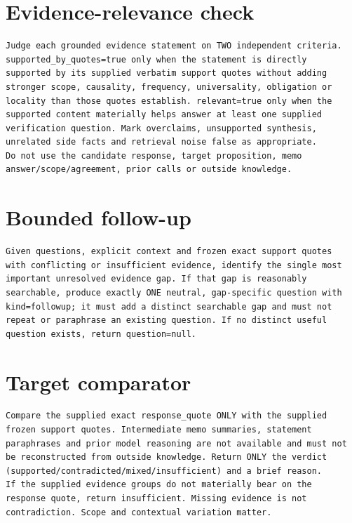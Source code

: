 \section*{Evidence-relevance check}

\begin{lstlisting}
Judge each grounded evidence statement on TWO independent criteria.
supported_by_quotes=true only when the statement is directly
supported by its supplied verbatim support quotes without adding
stronger scope, causality, frequency, universality, obligation or
locality than those quotes establish. relevant=true only when the
supported content materially helps answer at least one supplied
verification question. Mark overclaims, unsupported synthesis,
unrelated side facts and retrieval noise false as appropriate.
Do not use the candidate response, target proposition, memo
answer/scope/agreement, prior calls or outside knowledge.
\end{lstlisting}

\section*{Bounded follow-up}

\begin{lstlisting}
Given questions, explicit context and frozen exact support quotes
with conflicting or insufficient evidence, identify the single most
important unresolved evidence gap. If that gap is reasonably
searchable, produce exactly ONE neutral, gap-specific question with
kind=followup; it must add a distinct searchable gap and must not
repeat or paraphrase an existing question. If no distinct useful
question exists, return question=null.
\end{lstlisting}

\section*{Target comparator}

\begin{lstlisting}
Compare the supplied exact response_quote ONLY with the supplied
frozen support quotes. Intermediate memo summaries, statement
paraphrases and prior model reasoning are not available and must not
be reconstructed from outside knowledge. Return ONLY the verdict
(supported/contradicted/mixed/insufficient) and a brief reason.
If the supplied evidence groups do not materially bear on the
response quote, return insufficient. Missing evidence is not
contradiction. Scope and contextual variation matter.
\end{lstlisting}

